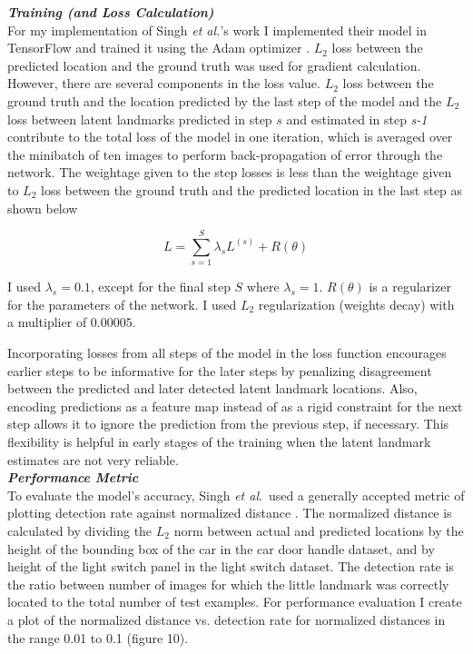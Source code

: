 \documentclass [11pt,letterpaper ,twoside ,openany ]{report}
\begin{document}
    \noindent
    \textbf{\textit{Training (and Loss Calculation)}}\\
    For my implementation of Singh \textit{et al.}'s work I implemented their model in TensorFlow and trained it using the Adam optimizer \cite{kingma2014adam}. \(L_2\) loss between the predicted location and the ground truth was used for gradient calculation. However, there are several components in the loss value. \(L_2\) loss between the ground truth and the location predicted by the last step of the model and the \(L_2\) loss between latent landmarks predicted in step \(s\) and estimated in step \textit {s-1} contribute to the total loss of the model in one iteration, which is averaged over the minibatch of ten images to perform back-propagation of error through the network. The weightage given to the step losses is less than the weightage given to \(L_2\) loss between the ground truth and the predicted location in the last step as shown below

    \[ L =  \displaystyle\sum_{s=1}^{S} \lambda _s L^{(s)} + R(\theta)\]

    \noindent
    I used \( \lambda _s = 0.1 \), except for the final step \(S\) where \( \lambda _s = 1\).  \( R(\theta) \) is a regularizer for the parameters of the network. I used \(L_2\) regularization (weights decay) with a multiplier of \(0.00005\). 
        
    Incorporating losses from all steps of the model in the loss function encourages earlier steps to be informative for the later steps by penalizing disagreement between the predicted and later detected latent landmark locations. Also, encoding predictions as a feature map instead of as a rigid constraint for the next step allows it to ignore the prediction from the previous step, if necessary. This flexibility is helpful in early stages of the training when the latent landmark estimates are not very reliable.\\

    \noindent
    \textbf{\textit{Performance Metric}}\\
    To evaluate the model's accuracy, Singh \textit{et al}.\ used a generally accepted metric of plotting detection rate against normalized distance  \cite{godil2014performance}. The normalized distance is calculated by dividing the \(L_2\) norm between actual and predicted locations by the height of the bounding box of the car in the car door handle dataset,  and by height of the light switch panel in the light switch dataset. The detection rate is the ratio between number of images for which the little landmark was correctly located to the total number of test examples. For performance evaluation I create a plot of the normalized distance vs. detection rate for normalized distances in the range 0.01 to 0.1 (figure 10).
\end{document}
